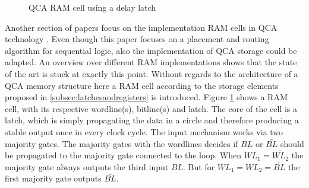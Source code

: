 \begin{figure}
	\caption{QCA RAM cell using a delay latch}\label{fig:QCA_RAM}
\end{figure}
Another section of papers focus on the implementation RAM cells in QCA technology \cite{crosstalk, RAM_cell}. Even though this paper focuses on a placement and routing algorithm for sequential logic, also the implementation of QCA storage could be adapted. An overview \cite{RAM_overview} over different RAM implementations shows that the state of the art is stuck at exactly this point. Without regards to the architecture of a QCA memory structure here a RAM cell according to the storage elements proposed in \ref{subsec:latchesandregisters} is introduced. Figure \ref{fig:QCA_RAM} shows a RAM cell, with its respective wordline(s), bitline(s) and latch. The core of the cell is a latch, which is simply propagating the data in a circle and therefore producing a stable output once in every clock cycle. The input mechanism works via two majority gates. The majority gates with the wordlines decides if $BL$ or $\bar{BL}$ should be propagated to the majority gate connected to the loop. When $WL_1=\bar{WL_2}$ the majority gate always outputs the third input $BL$. But for $WL_1=WL_2=\bar{BL}$ the first majority gate outputs $\bar{BL}$.
